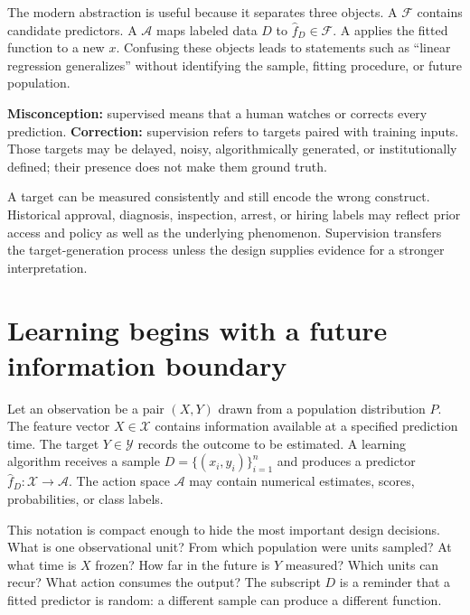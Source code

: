 The modern abstraction is useful because it separates three objects. A
 $\mathcal{F}$ contains candidate predictors. A
 $\mathcal{A}$ maps labeled data $D$ to
$\widehat f_D\in\mathcal{F}$. A  applies the fitted
function to a new $x$. Confusing these objects leads to statements such as
``linear regression generalizes'' without identifying the sample, fitting
procedure, or future population.

\begin{misconceptionbox}
\textbf{Misconception:} supervised means that a human watches or corrects every
prediction. \textbf{Correction:} supervision refers to targets paired with
training inputs. Those targets may be delayed, noisy, algorithmically generated,
or institutionally defined; their presence does not make them ground truth.
\end{misconceptionbox}

\begin{warningbox}
A target can be measured consistently and still encode the wrong construct.
Historical approval, diagnosis, inspection, arrest, or hiring labels may reflect
prior access and policy as well as the underlying phenomenon. Supervision
transfers the target-generation process unless the design supplies evidence for
a stronger interpretation.
\end{warningbox}

\section{Learning begins with a future information boundary}

Let an observation be a pair $(X,Y)$ drawn from a population distribution
$P$. The feature vector $X\in\mathcal{X}$ contains information available at a
specified prediction time. The target $Y\in\mathcal{Y}$ records the outcome to
be estimated. A learning algorithm receives a sample
$D=\{(x_i,y_i)\}_{i=1}^n$ and produces a predictor
$\widehat f_D:\mathcal{X}\rightarrow\mathcal{A}$. The action space
$\mathcal{A}$ may contain numerical estimates, scores, probabilities, or class
labels.

This notation is compact enough to hide the most important design decisions.
What is one observational unit? From which population were units sampled? At
what time is $X$ frozen? How far in the future is $Y$ measured? Which units can
recur? What action consumes the output? The subscript $D$ is a reminder that a
fitted predictor is random: a different sample can produce a different
function.


